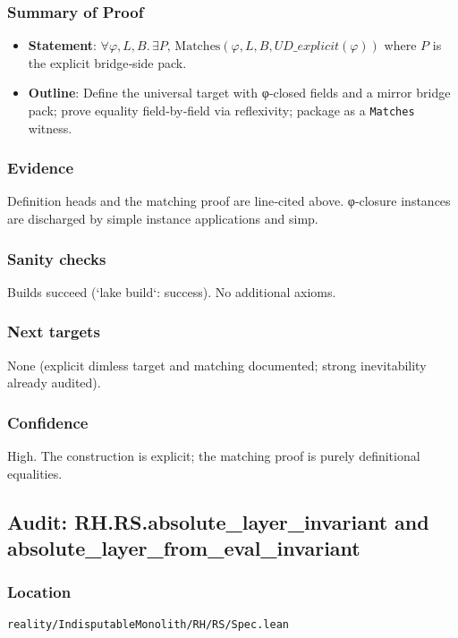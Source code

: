 \documentclass{article}
\newcommand{\FileRef}[1]{\texttt{#1}}
\begin{document}
\subsubsection{Summary of Proof}
\begin{itemize}[leftmargin=*]
  \item \textbf{Statement}: \(\forall φ,L,B.\, \exists P,\,\mathrm{Matches}(φ,L,B,UD\_explicit(φ))\) where \(P\) is the explicit bridge‑side pack.
  \item \textbf{Outline}: Define the universal target with φ‑closed fields and a mirror bridge pack; prove equality field‑by‑field via reflexivity; package as a \texttt{Matches} witness.
\end{itemize}

\subsubsection{Evidence}
Definition heads and the matching proof are line‑cited above. φ‑closure instances are discharged by simple instance applications and simp.

\subsubsection{Sanity checks}
Builds succeed (`lake build`: success). No additional axioms.

\subsubsection{Next targets}
None (explicit dimless target and matching documented; strong inevitability already audited).

\subsubsection{Confidence}
High. The construction is explicit; the matching proof is purely definitional equalities.

\subsection{Audit: RH.RS.absolute\_layer\_invariant and absolute\_layer\_from\_eval\_invariant}
\subsubsection{Location}
\FileRef{reality/IndisputableMonolith/RH/RS/Spec.lean}
\end{document}
